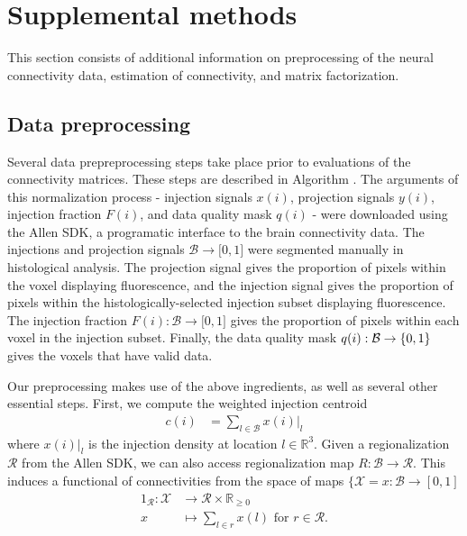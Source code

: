 \newpage 
\section{Supplemental methods}
\label{supp_sec:methods}

This section consists of additional information on preprocessing of the neural connectivity data, estimation of connectivity, and matrix factorization.

\subsection{Data preprocessing}
\label{supp_sec:dp}

Several data prepreprocessing steps take place prior to evaluations of the connectivity matrices.
These steps are described in Algorithm \pre.
The arguments of this normalization process - injection signals $x(i)$, projection signals $y(i)$, injection fraction $F(i)$, and data quality mask $q(i)$ - were downloaded using the Allen SDK, a programatic interface to the brain connectivity data.
The injections and projection signals $ \mathcal B \to \mathbb [0,1]$ were segmented manually in histological analysis.
The projection signal gives the proportion of pixels within the voxel displaying fluorescence, and the injection signal gives the proportion of pixels within the histologically-selected injection subset displaying fluorescence.
The injection fraction $F(i): \mathcal B \to \mathbb [0,1]$ gives the proportion of pixels within each voxel in the injection subset.
Finally, the data quality mask $q(i): \mathcal B \to \mathbb \{0,1\}$ gives the voxels that have valid data.

Our preprocessing makes use of the above ingredients, as well as several other essential steps.
First, we compute the weighted injection centroid
\begin{eqnarray*}
c(i) &= \sum_{l \in \mathcal B} x (i) |_l 
\end{eqnarray*}
where $x(i) |_l$ is the injection density at location $l \in \mathbb R^3$.
Given a regionalization $\mathcal R$ from the Allen SDK, we can also access regionalization map $R: \mathcal B  \to \mathcal R $.
This induces a functional of connectivities from the space of maps $\{\mathcal X = x: \mathcal B \to [0,1]$
\begin{eqnarray*}
1_{\mathcal R}: \mathcal X &\to \mathcal R \times \mathbb R_{\geq 0} \\
x &\mapsto \sum_{l \in r}  x(l)  \text{ for } r \in \mathcal R.
\end{eqnarray*}

